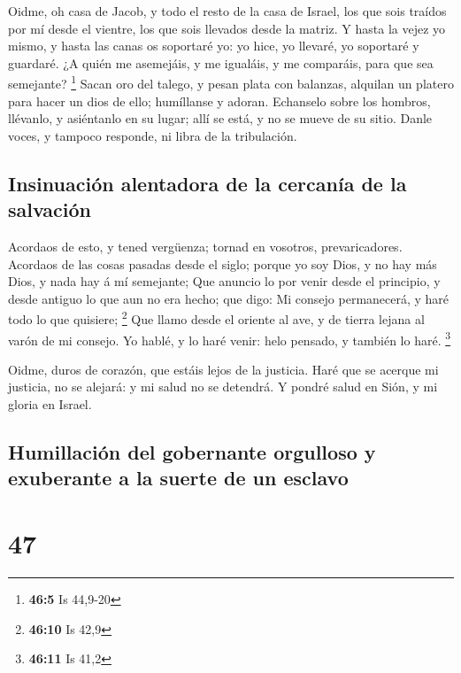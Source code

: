  Oidme, oh casa de Jacob, y todo el resto de la casa de
Israel, los que sois traídos por mí desde el vientre, los que sois
llevados desde la matriz.  Y hasta la vejez yo mismo, y
hasta las canas os soportaré yo: yo hice, yo llevaré, yo soportaré y
guardaré.  ¿A quién me asemejáis, y me igualáis, y me
comparáis, para que sea semejante? \footnote{\textbf{46:5} Is 44,9-20}
 Sacan oro del talego, y pesan plata con balanzas,
alquilan un platero para hacer un dios de ello; humíllanse y adoran.
 Echanselo sobre los hombros, llévanlo, y asiéntanlo en su
lugar; allí se está, y no se mueve de su sitio. Danle voces, y tampoco
responde, ni libra de la tribulación.

\hypertarget{insinuaciuxf3n-alentadora-de-la-cercanuxeda-de-la-salvaciuxf3n}{%
\subsection{Insinuación alentadora de la cercanía de la
salvación}\label{insinuaciuxf3n-alentadora-de-la-cercanuxeda-de-la-salvaciuxf3n}}

 Acordaos de esto, y tened vergüenza; tornad en vosotros,
prevaricadores.  Acordaos de las cosas pasadas desde el
siglo; porque yo soy Dios, y no hay más Dios, y nada hay á mí semejante;
 Que anuncio lo por venir desde el principio, y desde
antiguo lo que aun no era hecho; que digo: Mi consejo permanecerá, y
haré todo lo que quisiere; \footnote{\textbf{46:10} Is 42,9}
 Que llamo desde el oriente al ave, y de tierra lejana al
varón de mi consejo. Yo hablé, y lo haré venir: helo pensado, y también
lo haré. \footnote{\textbf{46:11} Is 41,2}

 Oidme, duros de corazón, que estáis lejos de la
justicia.  Haré que se acerque mi justicia, no se
alejará: y mi salud no se detendrá. Y pondré salud en Sión, y mi gloria
en Israel.

\hypertarget{humillaciuxf3n-del-gobernante-orgulloso-y-exuberante-a-la-suerte-de-un-esclavo}{%
\subsection{Humillación del gobernante orgulloso y exuberante a la
suerte de un
esclavo}\label{humillaciuxf3n-del-gobernante-orgulloso-y-exuberante-a-la-suerte-de-un-esclavo}}

\hypertarget{section-46}{%
\section{47}\label{section-46}}


